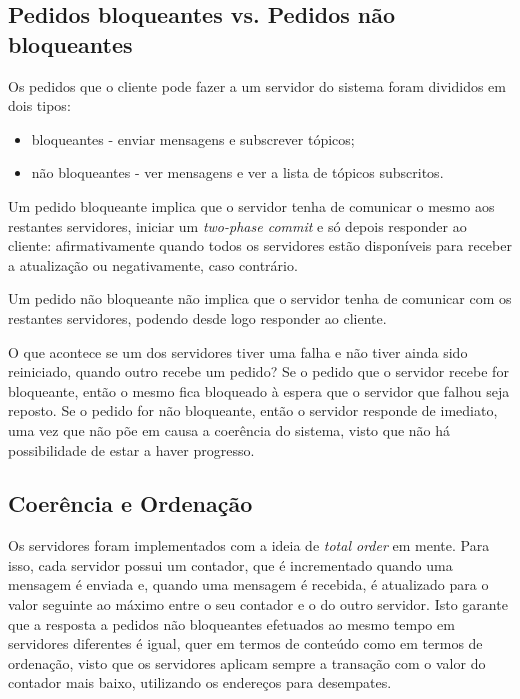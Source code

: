 \documentclass[a4paper]{report}
\begin{document}
		\subsection{Pedidos bloqueantes vs. Pedidos não bloqueantes}

		Os pedidos que o cliente pode fazer a um servidor do sistema foram divididos em dois tipos: 
		\begin{itemize}
			\item bloqueantes - enviar mensagens e subscrever tópicos;
			\item não bloqueantes - ver mensagens e ver a lista de tópicos subscritos.
		\end{itemize}
		
		Um pedido bloqueante implica que o servidor tenha de comunicar o mesmo aos restantes servidores, iniciar um \textit{two-phase commit} e só depois responder ao cliente:
		afirmativamente quando todos os servidores estão disponíveis para receber a atualização ou negativamente, caso contrário.

		Um pedido não bloqueante não implica que o servidor tenha de comunicar com os restantes servidores, podendo desde logo responder ao cliente.

		O que acontece se um dos servidores tiver uma falha e não tiver ainda sido reiniciado, quando outro recebe um pedido?
		Se o pedido que o servidor recebe for bloqueante, então o mesmo fica bloqueado à espera que o servidor que falhou seja reposto.
		Se o pedido for não bloqueante, então o servidor responde de imediato, uma vez que não põe em causa a coerência do sistema, visto que não há possibilidade de estar a haver progresso.


		\subsection{Coerência e Ordenação}

		Os servidores foram implementados com a ideia de \textit{total order} em mente. Para isso, cada servidor possui um contador, que é incrementado quando uma mensagem é enviada e, quando uma mensagem é recebida, é atualizado para o valor seguinte ao máximo entre o seu contador e o do outro servidor. 
		Isto garante que a resposta a pedidos não bloqueantes efetuados ao mesmo tempo em servidores diferentes é igual, quer em termos de conteúdo como em termos de ordenação, visto que os servidores aplicam sempre a transação com o valor do contador mais baixo, utilizando os endereços para desempates.
\end{document}
